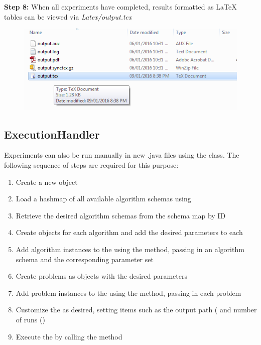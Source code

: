 \documentclass[titlepage]{article}
\begin{document}
\textbf{Step 8:} When all experiments have completed, results formatted as LaTeX tables can be viewed via \textit{Latex/output.tex}

\begin{figure}[H]
\centering
\includegraphics[width=160mm]{Images/guiSteps/step8.png}
\end{figure}

\clearpage

\subsection{ExecutionHandler}

Experiments can also be run manually in new .java files using the  class. The following sequence of steps are required for this purpose:

\begin{enumerate}
\item Create a new  object
\item Load a hashmap of all available algorithm schemas using 
\item Retrieve the desired algorithm schemas from the schema map by ID
\item Create  objects for each algorithm and add the desired parameters to each
\item Add algorithm instances to the  using the  method, passing in an algorithm schema and the corresponding parameter set
\item Create problems as  objects with the desired parameters
\item Add problem instances to the  using the  method, passing in each problem
\item Customize the  as desired, setting items such as the output path ( and number of runs ()
\item Execute the  by calling the  method
\end{enumerate}
\end{document}
